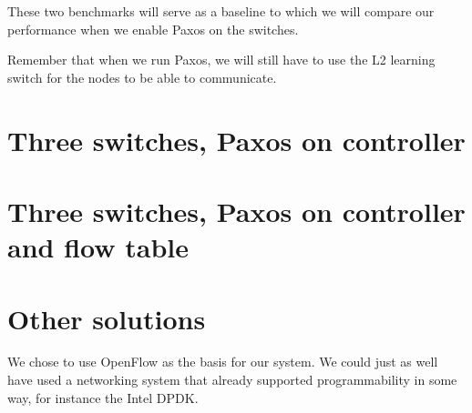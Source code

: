 These two benchmarks will serve as a baseline to which we will compare our
performance when we enable Paxos on the switches.

Remember that when we run Paxos, we will still have to use the L2 learning
switch for the nodes to be able to communicate.


\section{Three switches, Paxos on controller}


\section{Three switches, Paxos on controller and flow table}


\section{Other solutions}

We chose to use OpenFlow as the basis for our system.
We could just as well have used a networking system that already supported
programmability in some way, for instance the Intel DPDK.

